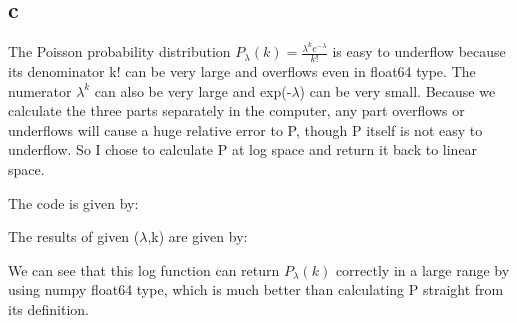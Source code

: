 \subsection{c}
The Poisson probability distribution $P_\lambda(k)=\frac{\lambda^k e^{-\lambda}}{k!} $ is easy to underflow because its denominator k! can be very large and overflows even in float64 type. The numerator $\lambda^k$ can also be very large and exp(-$\lambda$) can be very small. Because we calculate the three parts separately in the computer, any part overflows or underflows will cause a huge relative error to P, though P itself is not easy to underflow. So I chose to calculate P at log space and return it back to linear space.

The code is given by:


The results of given ($\lambda$,k) are given by:


We can see that this log function can return $P_\lambda(k)$ correctly in a large range by using numpy float64 type, which is much better than calculating P straight from its definition.
